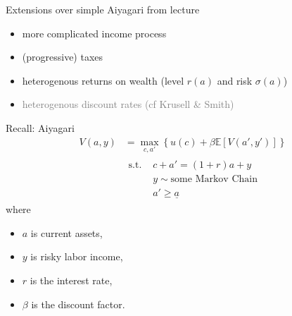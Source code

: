 \documentclass[aspectratio=169,mathserif]{beamer}
\begin{document}
\begin{frame}{Extensions over simple Aiyagari from lecture}
    \begin{itemize}
        \item more complicated income process
        \item (progressive) taxes
        \item heterogenous returns on wealth (level $r(a)$ and risk $\sigma(a)$)
        \item \textcolor{gray}{heterogenous discount rates (cf Krusell \& Smith)}
    \end{itemize}
    
\end{frame}





\begin{frame}{Recall: Aiyagari}
    \begin{align*}
    V(a, y) &= \max_{c, a'} \left\{ u(c) + \beta \mathbb{E}[V(a', y')] \right\} \\
    &\begin{aligned} \text{s.t. } & c + a' = (1 + r) a + y
        \\
        &y \sim \text{some Markov Chain} \\
        &a' \geq \underline{a}
    \end{aligned}
    \end{align*}
    where
    \begin{itemize}
        \item $a$ is current assets,
        \item $y$ is risky labor income,
        \item $r$ is the interest rate,
        \item $\beta$ is the discount factor.
    \end{itemize}
\end{frame}
\end{document}
